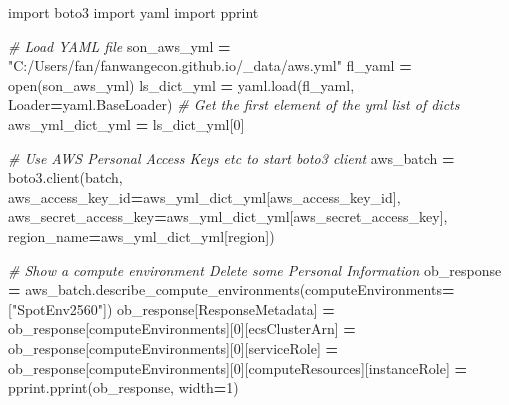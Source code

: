 \documentclass[
]{book}
\newenvironment{Shaded}{\begin{snugshade}}{\end{snugshade}}
\newcommand{\BuiltInTok}[1]{#1}
\newcommand{\CommentTok}[1]{\textcolor[rgb]{0.56,0.35,0.01}{\textit{#1}}}
\newcommand{\DecValTok}[1]{\textcolor[rgb]{0.00,0.00,0.81}{#1}}
\newcommand{\ImportTok}[1]{#1}
\newcommand{\NormalTok}[1]{#1}
\newcommand{\OperatorTok}[1]{\textcolor[rgb]{0.81,0.36,0.00}{\textbf{#1}}}
\newcommand{\StringTok}[1]{\textcolor[rgb]{0.31,0.60,0.02}{#1}}
\begin{document}
\begin{Shaded}
\begin{Highlighting}[]
\ImportTok{import}\NormalTok{ boto3}
\ImportTok{import}\NormalTok{ yaml}
\ImportTok{import}\NormalTok{ pprint}

\CommentTok{\# Load YAML file}
\NormalTok{son\_aws\_yml }\OperatorTok{=} \StringTok{"C:/Users/fan/fanwangecon.github.io/\_data/aws.yml"}
\NormalTok{fl\_yaml }\OperatorTok{=} \BuiltInTok{open}\NormalTok{(son\_aws\_yml)}
\NormalTok{ls\_dict\_yml }\OperatorTok{=}\NormalTok{ yaml.load(fl\_yaml, Loader}\OperatorTok{=}\NormalTok{yaml.BaseLoader)}
\CommentTok{\# Get the first element of the yml list of dicts}
\NormalTok{aws\_yml\_dict\_yml }\OperatorTok{=}\NormalTok{ ls\_dict\_yml[}\DecValTok{0}\NormalTok{]}

\CommentTok{\# Use AWS Personal Access Keys etc to start boto3 client}
\NormalTok{aws\_batch }\OperatorTok{=}\NormalTok{ boto3.client(}\StringTok{\textquotesingle{}batch\textquotesingle{}}\NormalTok{,}
\NormalTok{  aws\_access\_key\_id}\OperatorTok{=}\NormalTok{aws\_yml\_dict\_yml[}\StringTok{\textquotesingle{}aws\_access\_key\_id\textquotesingle{}}\NormalTok{],}
\NormalTok{  aws\_secret\_access\_key}\OperatorTok{=}\NormalTok{aws\_yml\_dict\_yml[}\StringTok{\textquotesingle{}aws\_secret\_access\_key\textquotesingle{}}\NormalTok{],}
\NormalTok{  region\_name}\OperatorTok{=}\NormalTok{aws\_yml\_dict\_yml[}\StringTok{\textquotesingle{}region\textquotesingle{}}\NormalTok{])}

\CommentTok{\# Show a compute environment Delete some Personal Information}
\NormalTok{ob\_response }\OperatorTok{=}\NormalTok{ aws\_batch.describe\_compute\_environments(computeEnvironments}\OperatorTok{=}\NormalTok{[}\StringTok{"SpotEnv2560"}\NormalTok{])}
\NormalTok{ob\_response[}\StringTok{\textquotesingle{}ResponseMetadata\textquotesingle{}}\NormalTok{] }\OperatorTok{=} \StringTok{\textquotesingle{}\textquotesingle{}}
\NormalTok{ob\_response[}\StringTok{\textquotesingle{}computeEnvironments\textquotesingle{}}\NormalTok{][}\DecValTok{0}\NormalTok{][}\StringTok{\textquotesingle{}ecsClusterArn\textquotesingle{}}\NormalTok{] }\OperatorTok{=} \StringTok{\textquotesingle{}\textquotesingle{}}
\NormalTok{ob\_response[}\StringTok{\textquotesingle{}computeEnvironments\textquotesingle{}}\NormalTok{][}\DecValTok{0}\NormalTok{][}\StringTok{\textquotesingle{}serviceRole\textquotesingle{}}\NormalTok{] }\OperatorTok{=} \StringTok{\textquotesingle{}\textquotesingle{}}
\NormalTok{ob\_response[}\StringTok{\textquotesingle{}computeEnvironments\textquotesingle{}}\NormalTok{][}\DecValTok{0}\NormalTok{][}\StringTok{\textquotesingle{}computeResources\textquotesingle{}}\NormalTok{][}\StringTok{\textquotesingle{}instanceRole\textquotesingle{}}\NormalTok{] }\OperatorTok{=} \StringTok{\textquotesingle{}\textquotesingle{}}
\NormalTok{pprint.pprint(ob\_response, width}\OperatorTok{=}\DecValTok{1}\NormalTok{)}
\end{Highlighting}
\end{Shaded}
\end{document}
